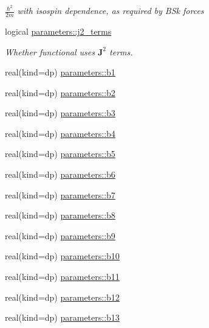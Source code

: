 \begin{DoxyCompactItemize}
\begin{DoxyCompactList}\small\item\em $\frac{\hbar^2}{2m}$ with isospin dependence, as required by B\+Sk forces \end{DoxyCompactList}\item 
logical \mbox{\hyperlink{group__SKYRME__PARS_ga8d1441b6c74260a2058e73213ae60941}{parameters\+::j2\+\_\+terms}}
\begin{DoxyCompactList}\small\item\em Whether functional uses $\textbf{J}^2$ terms. \end{DoxyCompactList}\item 
real(kind=dp) \mbox{\hyperlink{group__SKYRME__COEFFS_ga370f8790e2b550acb651df944341c38a}{parameters\+::b1}}
\item 
real(kind=dp) \mbox{\hyperlink{group__SKYRME__COEFFS_gafeab3f7d25c9403fc9278f88e131e394}{parameters\+::b2}}
\item 
real(kind=dp) \mbox{\hyperlink{group__SKYRME__COEFFS_ga9b2ac7e2a2fd38fad3f2d4aa9eb74827}{parameters\+::b3}}
\item 
real(kind=dp) \mbox{\hyperlink{group__SKYRME__COEFFS_gaa0e98c8120ce5a6ee2c59e99e54b1564}{parameters\+::b4}}
\item 
real(kind=dp) \mbox{\hyperlink{group__SKYRME__COEFFS_ga86d34226c6b6f89e732f7acb9d6fc53d}{parameters\+::b5}}
\item 
real(kind=dp) \mbox{\hyperlink{group__SKYRME__COEFFS_ga375601587cabd94f376823158f6b3573}{parameters\+::b6}}
\item 
real(kind=dp) \mbox{\hyperlink{group__SKYRME__COEFFS_ga93c2fa7fcb7fac6304867a02d6fb21c3}{parameters\+::b7}}
\item 
real(kind=dp) \mbox{\hyperlink{group__SKYRME__COEFFS_ga9b6e33a75b631e3ba0f050460ffd5895}{parameters\+::b8}}
\item 
real(kind=dp) \mbox{\hyperlink{group__SKYRME__COEFFS_ga78905f183069e7fb9d101ae402ddd299}{parameters\+::b9}}
\item 
real(kind=dp) \mbox{\hyperlink{group__SKYRME__COEFFS_ga8810e38b014109a9b8eab1862dcc48d4}{parameters\+::b10}}
\item 
real(kind=dp) \mbox{\hyperlink{group__SKYRME__COEFFS_ga1590f4a1a23ab65ab7aebe0422add4d3}{parameters\+::b11}}
\item 
real(kind=dp) \mbox{\hyperlink{group__SKYRME__COEFFS_gad5af273df649cc4a1f0efdbb3a21078c}{parameters\+::b12}}
\item 
real(kind=dp) \mbox{\hyperlink{group__SKYRME__COEFFS_ga0cfa3a610d32b67d583a86f8b6e19c47}{parameters\+::b13}}

\end{DoxyCompactItemize}
